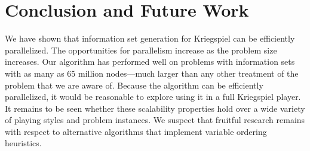 \documentclass[10pt, conference, compsocconf]{IEEEtran}
\begin{document}
%

\section{Conclusion and Future Work}
We have shown that information set generation for Kriegspiel can be efficiently
parallelized.  The opportunities for parallelism increase as the problem size
increases.  Our algorithm has performed well on problems with information sets
with as many as 65 million nodes---much larger than any other treatment of the
problem that we are aware of.  Because the algorithm can be efficiently
parallelized, it would be reasonable to explore using it in a full Kriegspiel
player.  It remains to be seen whether these scalability properties hold over a
wide variety of playing styles and problem instances.  We suspect that fruitful
research remains with respect to alternative algorithms that implement variable
ordering heuristics.
\end{document}
